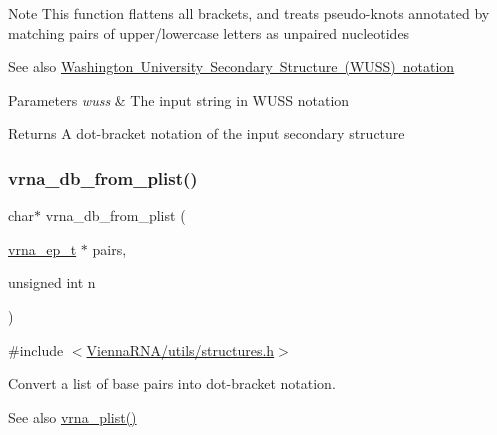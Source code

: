 \begin{DoxyNote}{Note}
This function flattens all brackets, and treats pseudo-\/knots annotated by matching pairs of upper/lowercase letters as unpaired nucleotides
\end{DoxyNote}
\begin{DoxySeeAlso}{See also}
\mbox{\hyperlink{rna_structure_notations_wuss-notation}{Washington University Secondary Structure (W\+U\+SS) notation}}
\end{DoxySeeAlso}

\begin{DoxyParams}{Parameters}
{\em wuss} & The input string in W\+U\+SS notation \\
\hline
\end{DoxyParams}
\begin{DoxyReturn}{Returns}
A dot-\/bracket notation of the input secondary structure 
\end{DoxyReturn}
\mbox{\label{group__struct__utils__dot__bracket_ga6a51a36b9245d0bac868c5cd172b9611}} 
\subsubsection{\texorpdfstring{vrna\_db\_from\_plist()}{vrna\_db\_from\_plist()}}
{\footnotesize\ttfamily char$\ast$ vrna\+\_\+db\+\_\+from\+\_\+plist (\begin{DoxyParamCaption}\item[{\mbox{\hyperlink{group__struct__utils__plist_gab9ac98ab55ded9fb90043b024b915aca}{vrna\+\_\+ep\+\_\+t}} $\ast$}]{pairs,  }\item[{unsigned int}]{n }\end{DoxyParamCaption})}



{\ttfamily \#include $<$\mbox{\hyperlink{utils_2structures_8h}{Vienna\+R\+N\+A/utils/structures.\+h}}$>$}



Convert a list of base pairs into dot-\/bracket notation. 

\begin{DoxySeeAlso}{See also}
\mbox{\hyperlink{group__struct__utils__plist_gaf002d69024d709744664a8b9ca3dd77d}{vrna\+\_\+plist()}} 
\end{DoxySeeAlso}

